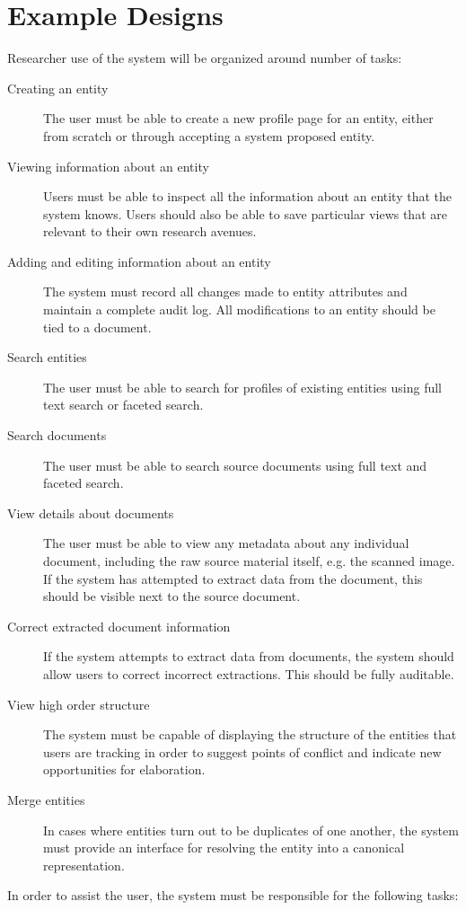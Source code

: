 \documentclass[format=siggraph, review=true]{acmart}
\begin{document}
\section{Example Designs}
Researcher use of the system will be organized around number of tasks:

\begin{description}
\item[Creating an entity] The user must be able to create a new profile
  page for an entity, either from scratch or through accepting a
  system proposed entity.
\item[Viewing information about an entity] Users must be able to inspect
  all the information about an entity that the system knows. Users should also
  be able to save particular views that are relevant to their own research
  avenues.
\item[Adding and editing information about an entity] The system must
  record all changes made to entity attributes and maintain a
  complete audit log. All modifications to an entity should be tied to
  a document.
\item[Search entities] The user must be able to search for profiles of
  existing entities using full text search or faceted search.
\item[Search documents] The user must be able to search source documents
  using full text and faceted search.
\item[View details about documents] The user must be able to view any
  metadata about any individual document, including the raw source material
  itself, e.g. the scanned image. If the system has attempted
  to extract data from the document, this should be visible next to
  the source document.
\item[Correct extracted document information] If the system attempts
  to extract data from documents, the system should allow users to
  correct incorrect extractions. This should be fully auditable.
\item[View high order structure] The system must be capable of displaying the
  structure of the entities that users are tracking in order to suggest points of
  conflict and indicate new opportunities for elaboration.
\item[Merge entities] In cases where entities turn out to be duplicates of one
  another, the system must provide an interface for resolving the entity into
  a canonical representation.
\end{description}

In order to assist the user, the system must be responsible for the
following tasks:
\end{document}
